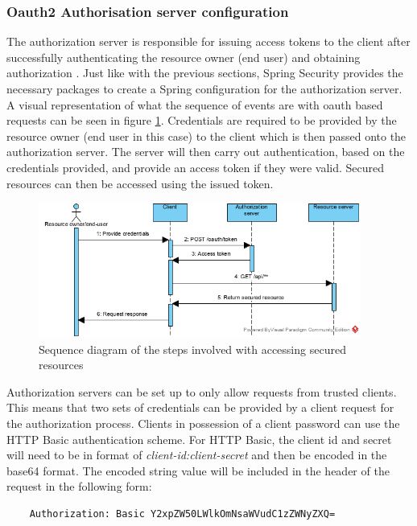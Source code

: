 \subsubsection{Oauth2 Authorisation server configuration}
The authorization server is responsible for issuing access tokens to the client after successfully authenticating the resource owner (end user)
and obtaining authorization \cite{hardt2012oauth}.
Just like with the previous sections, Spring Security provides the necessary packages to create a Spring configuration for the authorization
server.
A visual representation of what the sequence of events are with oauth based requests can be seen in figure \ref{oauthgrantflow}.
Credentials are required to be provided by the resource owner (end user in this case) to the client which is then passed onto the authorization
server.
The server will then carry out authentication, based on the credentials provided, and provide an access token if they were valid.
Secured resources can then be accessed using the issued token.

\clearpage
\begin{figure}[ht]
    \centering
    \includegraphics[width=400px]{images/oauth_grant_flow.png}
    \caption{Sequence diagram of the steps involved with accessing secured resources}
    \label{oauthgrantflow}
\end{figure}

Authorization servers can be set up to only allow requests from trusted clients.
This means that two sets of credentials can be provided by a client request for the authorization process.
Clients in possession of a client password can use the HTTP Basic authentication scheme.
For HTTP Basic, the client id and secret will need to be in format of \textit{client-id:client-secret} and then be encoded in the
base64 format. The encoded string value will be included in the header of the request in the following form: 

\begin{verbatim}
    Authorization: Basic Y2xpZW50LWlkOmNsaWVudC1zZWNyZXQ=
\end{verbatim}

